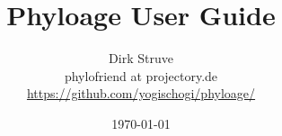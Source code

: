 \begin{titlepage}

\title{Phyloage User Guide}

\author{Dirk Struve\\
phylofriend at projectory.de\\
\href{https://github.com/yogischogi/phyloage/}{https://github.com/yogischogi/phyloage/}}
\date{\today}
\end{titlepage}
\maketitle
